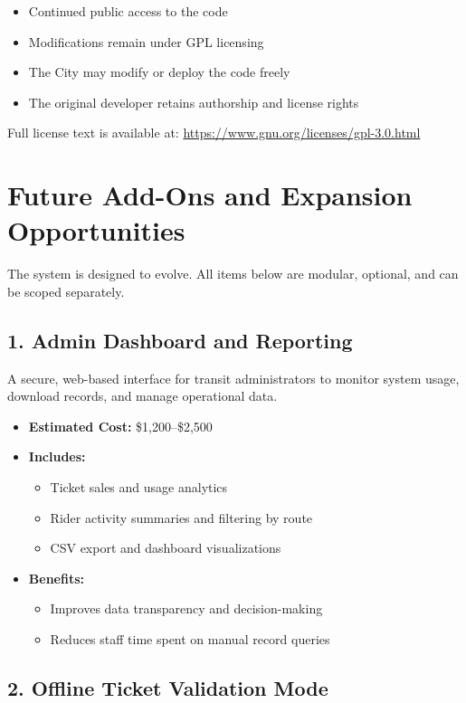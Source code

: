 \documentclass[12pt]{article}
\begin{document}
\begin{itemize}[itemsep=0.5em]
    \item Continued public access to the code
    \item Modifications remain under GPL licensing
    \item The City may modify or deploy the code freely
    \item The original developer retains authorship and license rights
\end{itemize}

Full license text is available at: \url{https://www.gnu.org/licenses/gpl-3.0.html}

\section{Future Add-Ons and Expansion Opportunities}
The system is designed to evolve. All items below are modular, optional, and can be scoped separately.
\subsection*{1. Admin Dashboard and Reporting}

A secure, web-based interface for transit administrators to monitor system usage, download records, and manage operational data.

\begin{itemize}
    \item \textbf{Estimated Cost:} \$1,200–\$2,500
    \item \textbf{Includes:}
    \begin{itemize}
        \item Ticket sales and usage analytics
        \item Rider activity summaries and filtering by route
        \item CSV export and dashboard visualizations
    \end{itemize}
    \item \textbf{Benefits:}
    \begin{itemize}
        \item Improves data transparency and decision-making
        \item Reduces staff time spent on manual record queries
    \end{itemize}
\end{itemize}

\subsection*{2. Offline Ticket Validation Mode}
\end{document}
